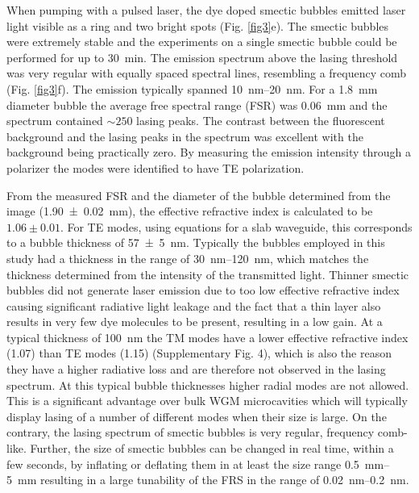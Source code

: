 \documentclass[a4paper,12pt]{article}
\begin{document}
	 When pumping with a pulsed laser, the dye doped smectic bubbles emitted laser light visible as a ring and two bright spots (Fig. \ref{fig3}e). The smectic bubbles were extremely stable and the experiments on a single smectic bubble could be performed for up to \SI{30}{min}. The emission spectrum above the lasing threshold was very regular with equally spaced spectral lines, resembling a frequency comb (Fig. \ref{fig3}f). The emission typically spanned \SIrange{10}{20}{nm}. For a \SI{1.8}{mm} diameter bubble the average free spectral range (FSR) was \SI{0.06}{mm} and the spectrum contained $\sim 250$ lasing peaks. The contrast between the fluorescent background and the lasing peaks in the spectrum was excellent with the background being practically zero. By measuring the emission intensity through a polarizer the modes were identified to have TE polarization.
	
	
	From the measured FSR and the diameter of the bubble determined from the image (\SI{1.90 \pm 0.02}{mm}), the effective refractive index is calculated to be $1.06 \pm 0.01$. For TE modes, using equations for a slab waveguide, this corresponds to a bubble thickness of \SI{57 \pm 5}{nm}. Typically the bubbles employed in this study had a thickness in the range of \SIrange{30}{120}{nm}, which matches the thickness determined from the intensity of the transmitted light. Thinner smectic bubbles did not generate laser emission due to too low effective refractive index causing significant radiative light leakage and the fact that a thin layer also results in very few dye molecules to be present, resulting in a low gain. At a typical thickness of \SI{100}{nm} the TM modes have a lower effective refractive index (1.07) than TE modes (1.15) (Supplementary Fig. 4), which is also the reason they have a higher radiative loss and are therefore not observed in the lasing spectrum. At this typical bubble thicknesses higher radial modes are not allowed. This is a significant advantage over bulk WGM microcavities which will typically display lasing of a number of different modes when their size is large. On the contrary, the lasing spectrum of smectic bubbles is very regular, frequency comb-like. Further, the size of smectic bubbles can be changed in real time, within a few seconds, by inflating or deflating them in at least the size range \SIrange{0.5}{5}{mm} resulting in a large tunability of the FRS in the range of \SIrange{0.02}{0.2}{nm}.
	
\end{document}
